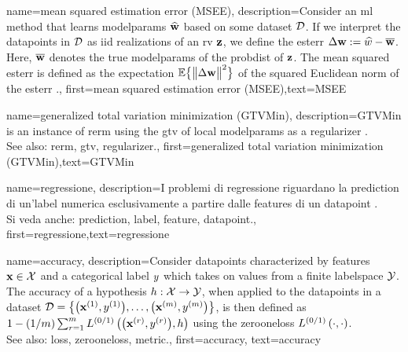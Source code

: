 {name={mean squared estimation error (MSEE)},
	description={Consider an \gls{ml} method that 
		learns \glspl{modelparam} $\widehat{{\bf w}}$ based on some \gls{dataset} $\mathcal{D}$. 
		If we interpret the \gls{datapoint}s in $\mathcal{D}$ as \gls{iid} \gls{realization}s of an \gls{rv} ${\bf z}$, 
		we define the \gls{esterr} $\Delta {\bf w} := \widehat{w} - \overline{{\bf w}}$. 
		Here, $\overline{{\bf w}}$ denotes the true \glspl{modelparam} of the \gls{probdist} 
		of ${\bf z}$. The \gls{mean} squared \gls{esterr} is 
		defined as the \gls{expectation} $\mathbb{E} \big\{ \big\| \Delta {\bf w} \big\|^{2} \big\}$ of the 
		squared Euclidean \gls{norm} of the \gls{esterr} \cite{LC,kay}.},
	first={mean squared estimation error (MSEE)},text={MSEE} 
}

{name={generalized total variation minimization (GTVMin)},
	description={GTVMin is an instance of \gls{rerm} 
		using the \gls{gtv} of local \glspl{modelparam} as a \gls{regularizer} \cite{ClusteredFLTVMinTSP}.
					\\ 
		See also: \gls{rerm}, \gls{gtv}, \gls{regularizer}.},
	first={generalized total variation minimization (GTVMin)},text={GTVMin} 
}

{name={regressione},
	description={I problemi di regressione riguardano la 
		\gls{prediction} di un'\gls{label} numerica esclusivamente a partire dalle \glspl{feature} di un \gls{datapoint} \cite[Ch. 2]{MLBasics}.
					\\ 
		Si veda anche: \gls{prediction}, \gls{label}, \gls{feature}, \gls{datapoint}.},
	first={regressione},text={regressione} 
}

{name={accuracy},
	description={Consider \glspl{datapoint} characterized by \glspl{feature} ${\bf x} \in \mathcal{X}$ and 
		a categorical \gls{label} $y$ which takes on values from a finite \gls{labelspace} $\mathcal{Y}$. The 
		accuracy of a \gls{hypothesis} $h: \mathcal{X} \rightarrow \mathcal{Y}$, when applied 
		to the \glspl{datapoint} in a \gls{dataset} $\mathcal{D} = \big\{ \big({\bf x}^{(1)}, y^{(1)} \big), \ldots, \big({\bf x}^{(m)},y^{(m)}\big) \big\}$, 
		is then defined as $1 - (1/m)\sum_{r=1}^{m} L^{(0/1)}\left(\big({\bf x}^{(r)},y^{(r)}\big),h \right)$ using the \gls{zerooneloss} $L^{(0/1)}\left(\cdot,\cdot \right)$.
					\\ 
		See also: \gls{loss}, \gls{zerooneloss}, \gls{metric}.},
	first={accuracy},
	text={accuracy} 
}






